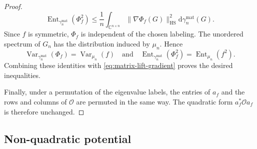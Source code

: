 \documentclass[11pt,reqno]{amsart}
\numberwithin{equation}{section}%
\numberwithin{figure}{section}%
\numberwithin{table}{section}
\theoremstyle{plain}
\theoremstyle{definition}
\begin{document}
\begin{proof}
\begin{equation}
    \operatorname{Ent}_{\gamma_n^{\mathrm{mat}}}(\Phi_f^2)
    \leq
    \frac{1}{n}\int_{\mathbb{C}^{n\times n}}
    \|\nabla\Phi_f(G)\|_{\mathrm{HS}}^2
    \mathrm{d}\gamma_n^{\mathrm{mat}}(G).
  \end{equation}
  Since $f$ is symmetric, $\Phi_f$ is independent of the chosen labeling.
  The unordered spectrum of $G_n$ has the distribution induced by $\mu_n$.
  Hence
  \begin{equation}
    \operatorname{Var}_{\gamma_n^{\mathrm{mat}}}(\Phi_f)
    =\operatorname{Var}_{\mu_n}(f)
    \quad\text{and}\quad
    \operatorname{Ent}_{\gamma_n^{\mathrm{mat}}}(\Phi_f^2)
    =\operatorname{Ent}_{\mu_n}(f^2).
  \end{equation}
  Combining these identities with \eqref{eq:matrix-lift-gradient} proves the
  desired inequalities.

  Finally, under a permutation of the eigenvalue labels, the entries of
  $a_f$ and the rows and columns of $\mathcal{O}$ are permuted in the same
  way. The quadratic form $a_f^*\mathcal{O}a_f$ is therefore unchanged.
\end{proof}

\subsection{Non-quadratic potential}
\end{document}

